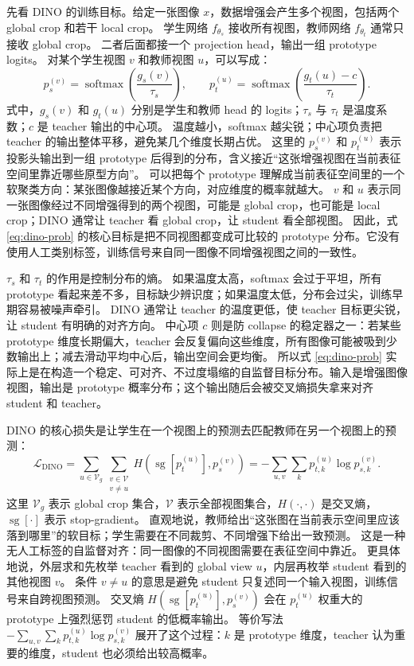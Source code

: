 \documentclass[11pt,a4paper]{ctexart}
\begin{document}
先看 DINO 的训练目标。给定一张图像 $x$，数据增强会产生多个视图，包括两个 global crop 和若干 local crop。
学生网络 $f_{\theta_s}$ 接收所有视图，教师网络 $f_{\theta_t}$ 通常只接收 global crop。
二者后面都接一个 projection head，输出一组 prototype logits。
对某个学生视图 $v$ 和教师视图 $u$，可以写成：
\begin{equation}
  \label{eq:dino-prob}
  p_s^{(v)} = \operatorname{softmax}\left(\frac{g_s(v)}{\tau_s}\right),
  \qquad
  p_t^{(u)} = \operatorname{softmax}\left(\frac{g_t(u)-c}{\tau_t}\right).
\end{equation}
式中，$g_s(v)$ 和 $g_t(u)$ 分别是学生和教师 head 的 logits；$\tau_s$ 与 $\tau_t$ 是温度系数；$c$ 是 teacher 输出的中心项。
温度越小，softmax 越尖锐；中心项负责把 teacher 的输出整体平移，避免某几个维度长期占优。
这里的 $p_s^{(v)}$ 和 $p_t^{(u)}$ 表示投影头输出到一组 prototype 后得到的分布，含义接近“这张增强视图在当前表征空间里靠近哪些原型方向”。
可以把每个 prototype 理解成当前表征空间里的一个软聚类方向：某张图像越接近某个方向，对应维度的概率就越大。
$v$ 和 $u$ 表示同一张图像经过不同增强得到的两个视图，可能是 global crop，也可能是 local crop；DINO 通常让 teacher 看 global crop，让 student 看全部视图。
因此，式 \eqref{eq:dino-prob} 的核心目标是把不同视图都变成可比较的 prototype 分布。它没有使用人工类别标签，训练信号来自同一图像不同增强视图之间的一致性。

$\tau_s$ 和 $\tau_t$ 的作用是控制分布的熵。
如果温度太高，softmax 会过于平坦，所有 prototype 看起来差不多，目标缺少辨识度；如果温度太低，分布会过尖，训练早期容易被噪声牵引。
DINO 通常让 teacher 的温度更低，使 teacher 目标更尖锐，让 student 有明确的对齐方向。
中心项 $c$ 则是防 collapse 的稳定器之一：若某些 prototype 维度长期偏大，teacher 会反复偏向这些维度，所有图像可能被吸到少数输出上；减去滑动平均中心后，输出空间会更均衡。
所以式 \eqref{eq:dino-prob} 实际上是在构造一个稳定、可对齐、不过度塌缩的自监督目标分布。输入是增强图像视图，输出是 prototype 概率分布；这个输出随后会被交叉熵损失拿来对齐 student 和 teacher。

DINO 的核心损失是让学生在一个视图上的预测去匹配教师在另一个视图上的预测：
\begin{equation}
  \label{eq:dino-loss}
  \mathcal{L}_{\text{DINO}}
  =
  \sum_{u\in\mathcal{V}_{g}}
  \sum_{\substack{v\in\mathcal{V}\\v\ne u}}
  H\left(\operatorname{sg}\left[p_t^{(u)}\right], p_s^{(v)}\right)
  =
  -\sum_{u,v}\sum_k p_{t,k}^{(u)}\log p_{s,k}^{(v)} .
\end{equation}
这里 $\mathcal{V}_{g}$ 表示 global crop 集合，$\mathcal{V}$ 表示全部视图集合，$H(\cdot,\cdot)$ 是交叉熵，$\operatorname{sg}[\cdot]$ 表示 stop-gradient。
直观地说，教师给出“这张图在当前表示空间里应该落到哪里”的软目标；学生需要在不同裁剪、不同增强下给出一致预测。
这是一种无人工标签的自监督对齐：同一图像的不同视图需要在表征空间中靠近。
更具体地说，外层求和先枚举 teacher 看到的 global view $u$，内层再枚举 student 看到的其他视图 $v$。
条件 $v\ne u$ 的意思是避免 student 只复述同一个输入视图，训练信号来自跨视图预测。
交叉熵 $H(\operatorname{sg}[p_t^{(u)}],p_s^{(v)})$ 会在 $p_t^{(u)}$ 权重大的 prototype 上强烈惩罚 student 的低概率输出。
等价写法 $-\sum_{u,v}\sum_k p_{t,k}^{(u)}\log p_{s,k}^{(v)}$ 展开了这个过程：$k$ 是 prototype 维度，teacher 认为重要的维度，student 也必须给出较高概率。
\end{document}
